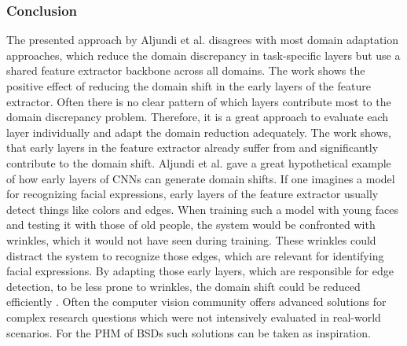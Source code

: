 \subsubsection{Conclusion}
The presented approach by Aljundi et al. \cite{Aljundi2016} disagrees with most domain adaptation approaches, which reduce the domain discrepancy in task-specific layers but use a shared feature extractor backbone across all domains. The work shows the positive effect of reducing the domain shift in the early layers of the feature extractor. Often there is no clear pattern of which layers contribute most to the domain discrepancy problem. Therefore, it is a great approach to evaluate each layer individually and adapt the domain reduction adequately. The work shows, that early layers in the feature extractor already suffer from and significantly contribute to the domain shift. Aljundi et al. \cite{Aljundi2016} gave a great hypothetical example of how early layers of CNNs can generate domain shifts. If one imagines a model for recognizing facial expressions, early layers of the feature extractor usually detect things like colors and edges. When training such a model with young faces and testing it with those of old people, the system would be confronted with wrinkles, which it would not have seen during training. These wrinkles could distract the system to recognize those edges, which are relevant for identifying facial expressions. By adapting those early layers, which are responsible for edge detection, to be less prone to wrinkles, the domain shift could be reduced efficiently \cite{Aljundi2016}. Often the computer vision community offers advanced solutions for complex research questions which were not intensively evaluated in real-world scenarios. For the PHM of BSDs such solutions can be taken as inspiration. 

